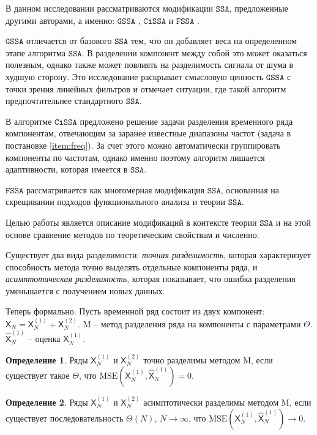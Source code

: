\documentclass[12pt, specialist, subf
]{disser}
\theoremstyle{definition}
\newcommand{\SSA}{\texttt{SSA}}
\newcommand{\GSSA}{\texttt{GSSA}}
\newcommand{\CISSA}{\texttt{CiSSA}}
\newcommand{\FSSA}{\texttt{FSSA}}
\newcommand{\TS}{\mathsf{X}}
\newtheorem{definition}{Определение} %
\begin{document}
В данном исследовании рассматриваются модификации $\SSA$, предложенные другими авторами, а именно: $\GSSA$ \cite{gu2024generalized}, $\CISSA$ \cite{bogalo2020} и $\FSSA$ \cite{haghbin2019functionalsingularspectrumanalysis}.


$\GSSA$ отличается от базового $\SSA$ тем, что он добавляет веса на определенном этапе алгоритма $\SSA$. В разделении компонент между собой это может оказаться полезным, однако также может повлиять на разделимость сигнала от шума в худшую сторону.
Это исследование раскрывает смысловую ценность $\GSSA$ с точки зрения линейных фильтров и отмечает ситуации, где такой алгоритм предпочтительнее стандартного $\SSA$.


В алгоритме $\CISSA$ предложено решение задачи разделения временного ряда компонентам, отвечающим за заранее известные диапазоны частот (задача в постановке \ref{item:freq}). За счет этого можно автоматически группировать компоненты по частотам, однако именно поэтому алгоритм лишается адаптивности, которая имеется в $\SSA$.

$\FSSA$ рассматривается как многомерная модификация $\SSA$, основанная на скрещивании подходов функционального анализа и теории $\SSA$.

Целью работы является описание модификаций в контексте теории $\SSA$ и на этой основе сравнение методов по теоретическим свойствам и численно.


Существует два вида разделимости: \textit{точная разделимость}, которая характеризует способность метода точно выделять отдельные компоненты ряда, и \textit{асимптотическая разделимость}, которая показывает, что ошибка разделения уменьшается с получением новых данных.

Теперь формально. Пусть временной ряд состоит из двух компонент:
\( \TS_N = \TS^{(1)}_N + \TS^{(2)}_N \).
$\mathrm M$ -- метод разделения ряда на компоненты с параметрами $\Theta$.
$\hat{\TS}_N^{(1)}$ -- оценка $\TS_N^{(1)}$.
\begin{definition}
	\label{def:exact}
	Ряды \( \TS^{(1)}_N \) и \( \TS^{(2)}_N \) точно разделимы методом $\mathrm M$, если существует такое \( {\Theta} \), что \( \mathrm{MSE}\left(\TS^{(1)}_N, \hat{\TS}^{(1)}_N\right) = 0 \).
\end{definition}

\begin{definition}
	\label{def:asymp}
	Ряды \( \TS^{(1)}_N \) и \( \TS^{(2)}_N \) асимптотически разделимы методом $\mathrm M$, если существует последовательность \( {\Theta}(N)\), \( N \rightarrow \infty \), что \( \mathrm{MSE}\left(\TS^{(1)}_N, \hat{\TS}^{(1)}_N\right) \rightarrow 0 \).
\end{definition}
\end{document}
